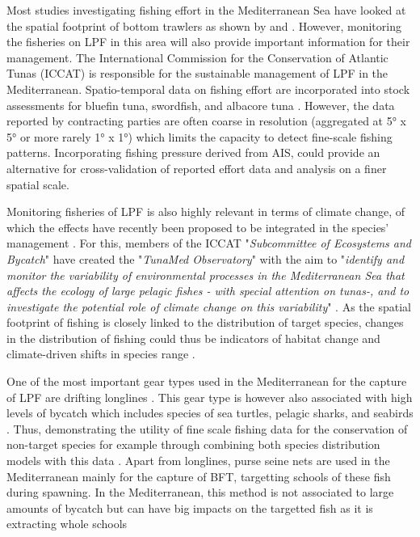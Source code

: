 Most studies investigating fishing effort in the Mediterranean Sea have looked at the spatial
footprint of bottom trawlers as shown by \cite{ferra_trawlers_change} and
\cite{marsaglia_trawling}. However, monitoring the fisheries on LPF in this area will also provide
important information for their management. The International Commission for the Conservation of
Atlantic Tunas (ICCAT) is responsible for the sustainable management of LPF in the Mediterranean.
Spatio-temporal data on fishing effort are incorporated into stock assessments for bluefin tuna,
swordfish, and albacore tuna \citep{iccat_bft_summary,iccat_swo_summary,iccat_alb_summary}.
However, the data reported by contracting parties are often coarse in resolution (aggregated at 5°
x 5° or more rarely 1° x 1°) which limits the capacity to detect fine-scale fishing patterns.
Incorporating fishing pressure derived from AIS, could provide an alternative for cross-validation
of reported effort data and analysis on a finer spatial scale.

\medskip

Monitoring fisheries of LPF is also highly relevant in terms of climate change, of which the
effects have recently been proposed to be integrated in the species' management
\citep{iccat_climate_change}. For this, members of the ICCAT "\textit{Subcommittee of Ecosystems
	and Bycatch}" have created the "\textit{TunaMed Observatory}" with the aim to "\textit{identify and
	monitor the variability of environmental processes in the Mediterranean Sea that affects the
	ecology of large pelagic fishes - with special attention on tunas-, and to investigate the
	potential role of climate change on this variability}" \citep{tunamed}. As the spatial footprint of
fishing is closely linked to the distribution of target species, changes in the distribution of
fishing could thus be indicators of habitat change and climate-driven shifts in species range
\citep{fishing_climate_change_shifts}.

\medskip

One of the most important gear types used in the Mediterranean for the capture of LPF are drifting
longlines \citep{FAO2025Longlines,iccat_alb_summary,iccat_bft_summary,iccat_swo_summary}. This gear
type is however also associated with high levels of bycatch which includes species of sea turtles,
pelagic sharks, and seabirds \citep{bycatch_book}. Thus, demonstrating the utility of fine scale
fishing data for the conservation of non-target species for example through combining both species
distribution models with this data \citep{welch_overlap_ais_bycatch}. Apart from longlines, purse
seine nets are used in the Mediterranean mainly for the capture of BFT, targetting schools of these
fish during spawning. In the Mediterranean, this method is not associated to large amounts of
bycatch but can have big impacts on the targetted fish as it is extracting whole schools
\citep{bycatch_book,iccat_bft_summary}

